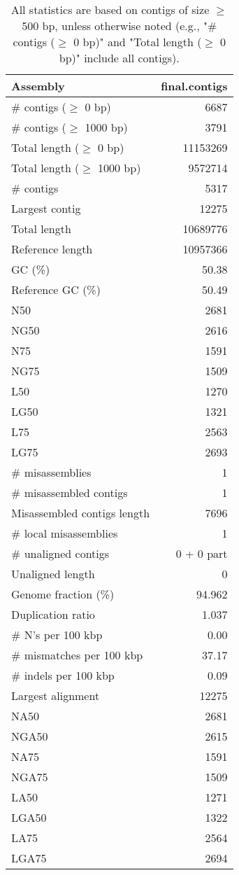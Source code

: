 \documentclass[12pt,a4paper]{article}
\begin{document}
\begin{table}[ht]
\begin{center}
\caption{All statistics are based on contigs of size $\geq$ 500 bp, unless otherwise noted (e.g., "\# contigs ($\geq$ 0 bp)" and "Total length ($\geq$ 0 bp)" include all contigs).}
\begin{tabular}{|l*{1}{|r}|}
\hline
Assembly & final.contigs \\ \hline
\# contigs ($\geq$ 0 bp) & 6687 \\ \hline
\# contigs ($\geq$ 1000 bp) & 3791 \\ \hline
Total length ($\geq$ 0 bp) & 11153269 \\ \hline
Total length ($\geq$ 1000 bp) & 9572714 \\ \hline
\# contigs & 5317 \\ \hline
Largest contig & 12275 \\ \hline
Total length & 10689776 \\ \hline
Reference length & 10957366 \\ \hline
GC (\%) & 50.38 \\ \hline
Reference GC (\%) & 50.49 \\ \hline
N50 & 2681 \\ \hline
NG50 & 2616 \\ \hline
N75 & 1591 \\ \hline
NG75 & 1509 \\ \hline
L50 & 1270 \\ \hline
LG50 & 1321 \\ \hline
L75 & 2563 \\ \hline
LG75 & 2693 \\ \hline
\# misassemblies & 1 \\ \hline
\# misassembled contigs & 1 \\ \hline
Misassembled contigs length & 7696 \\ \hline
\# local misassemblies & 1 \\ \hline
\# unaligned contigs & 0 + 0 part \\ \hline
Unaligned length & 0 \\ \hline
Genome fraction (\%) & 94.962 \\ \hline
Duplication ratio & 1.037 \\ \hline
\# N's per 100 kbp & 0.00 \\ \hline
\# mismatches per 100 kbp & 37.17 \\ \hline
\# indels per 100 kbp & 0.09 \\ \hline
Largest alignment & 12275 \\ \hline
NA50 & 2681 \\ \hline
NGA50 & 2615 \\ \hline
NA75 & 1591 \\ \hline
NGA75 & 1509 \\ \hline
LA50 & 1271 \\ \hline
LGA50 & 1322 \\ \hline
LA75 & 2564 \\ \hline
LGA75 & 2694 \\ \hline
\end{tabular}
\end{center}
\end{table}
\end{document}
